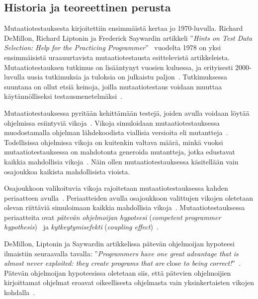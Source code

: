 \documentclass[finnish, grading]{tktltiki2}
\theoremstyle{definition}
\theoremstyle{remark}
\begin{document}
\subsection{Historia ja teoreettinen perusta}

Mutaatiotestauksesta kirjoitettiin ensimmäistä kertaa jo 1970-luvulla. Richard DeMillon, Richard Liptonin ja Frederick Saywardin artikkeli ''\textit{Hints on Test Data Selection: Help for the Practicing Programmer}''~\cite{DeMillo:Lipton:Sayward:1978} vuodelta 1978 on yksi ensimmäisistä uraauurtavista mutaatiotestausta esittelevistä artikkeleista. Mutaatiotestauksen tutkimus on lisääntynyt vuosien kuluessa, ja erityisesti 2000-luvulla uusia tutkimuksia ja tuloksia on julkaistu paljon~\cite[s. 1102]{Offutt:2011}. Tutkimuksessa suuntana on ollut etsiä keinoja, joilla mutaatiotestaus voidaan muuttaa käytännölliseksi testausmenetelmäksi~\cite[s. 649]{Jia:Harman:2011}. 

Mutaatiotestauksessa pyritään kehittämään testejä, joiden avulla voidaan löytää ohjelmissa esiintyviä vikoja~\cite[s. 650]{Jia:Harman:2011}. Vikoja simuloidaan mutaatiotestauksessa muodostamalla ohjelman lähdekoodista viallisia versioita eli mutantteja~\cite[s. 649]{Jia:Harman:2011}. Todellisissa ohjelmissa vikoja on kuitenkin valtava määrä, minkä vuoksi mutaatiotestauksessa on mahdotonta generoida mutantteja, jotka edustavat kaikkia mahdollisia vikoja~\cite[s. 650]{Jia:Harman:2011}. Näin ollen mutaatiotestauksessa käsitellään vain osajoukkoa kaikista mahdollisista vioista.

Osajoukkoon valikoituvia vikoja rajoitetaan mutaatiotestauksessa kahden periaatteen avulla~\cite[s. 5]{Offutt:1992:Coupling}. Periaatteiden avulla osajoukkoon valittujen vikojen oletetaan olevan riittäviä simuloimaan kaikkia mahdollisia vikoja~\cite[s. 650]{Jia:Harman:2011}. Mutaatiotestauksessa periaatteita ovat \textit{pätevän ohjelmoijan hypoteesi} (\textit{competent programmer hypothesis})~\cite[s. 34]{DeMillo:Lipton:Sayward:1978} ja \textit{kytkeytymisefekti} (\textit{coupling effect})~\cite[s. 35]{DeMillo:Lipton:Sayward:1978}.

DeMillon, Liptonin ja Saywardin artikkelissa pätevän ohjelmoijan hypoteesi ilmaistiin seuraavalla tavalla: ''\textit{Programmers have one great advantage that is almost never exploited: they create programs that are} close \textit{to being correct!}''~\cite[s. 34]{DeMillo:Lipton:Sayward:1978}. Pätevän ohjelmoijan hypoteesissa oletetaan siis, että pätevien ohjelmoijien kirjoittamat ohjelmat eroavat oikeellisesta ohjelmasta vain yksinkertaisten vikojen kohdalla~\cite[s. 5]{Offutt:1992:Coupling}.
\end{document}
